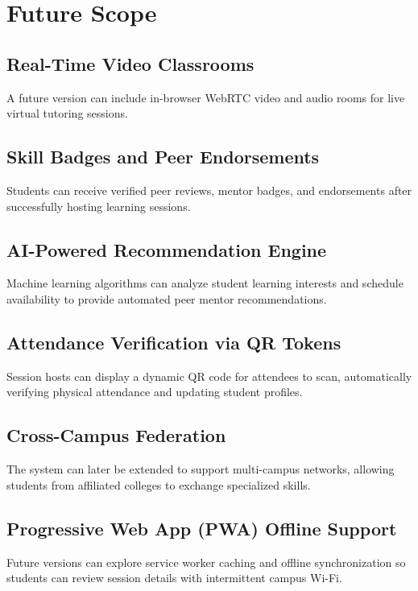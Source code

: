 \documentclass[12pt,a4paper]{report}
\begin{document}
\section{Future Scope}
\subsection{Real-Time Video Classrooms}
A future version can include in-browser WebRTC video and audio rooms for live virtual tutoring sessions.

\subsection{Skill Badges and Peer Endorsements}
Students can receive verified peer reviews, mentor badges, and endorsements after successfully hosting learning sessions.

\subsection{AI-Powered Recommendation Engine}
Machine learning algorithms can analyze student learning interests and schedule availability to provide automated peer mentor recommendations.

\subsection{Attendance Verification via QR Tokens}
Session hosts can display a dynamic QR code for attendees to scan, automatically verifying physical attendance and updating student profiles.

\subsection{Cross-Campus Federation}
The system can later be extended to support multi-campus networks, allowing students from affiliated colleges to exchange specialized skills.

\subsection{Progressive Web App (PWA) Offline Support}
Future versions can explore service worker caching and offline synchronization so students can review session details with intermittent campus Wi-Fi.

\newpage
\end{document}
